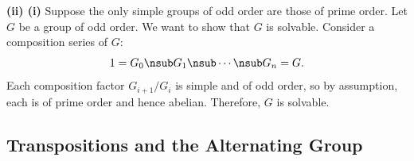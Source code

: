 \begin{problems}
\begin{sol}
        \noindent \textbf{(ii) \rightimp (i)} Suppose the only simple groups of odd order are those of prime order. Let $G$ be a group of odd order. We want to show that $G$ is solvable. Consider a composition series of $G$:
        \[1 = G_0 \nsub G_1 \nsub \cdots \nsub G_n = G.\]
        Each composition factor $G_{i+1}/G_i$ is simple and of odd order, so by assumption, each is of prime order and hence abelian. Therefore, $G$ is solvable.
    \end{sol}
\end{problems}

\newpage

\subsection{Transpositions and the Alternating Group}

